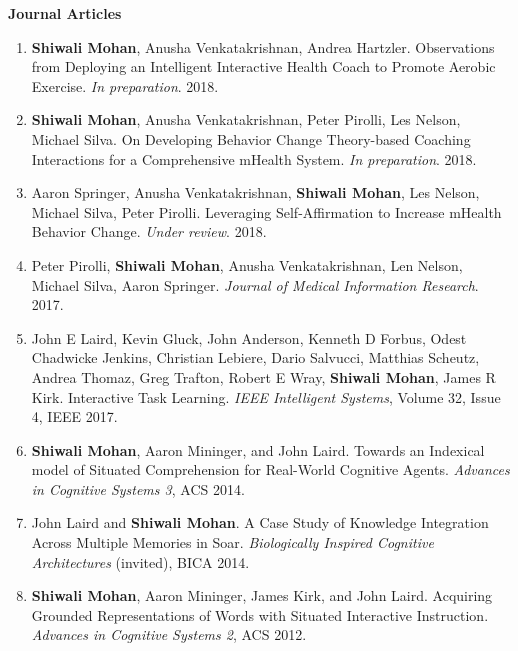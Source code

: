 \documentclass[margin,line,11pt]{res}
\begin{document}
\begin{resume}
\textbf{Journal Articles}
\begin{enumerate}[label=\lbrack J\arabic*\rbrack, leftmargin=*]
\item \textbf{Shiwali Mohan}, Anusha Venkatakrishnan, Andrea Hartzler. Observations from Deploying an Intelligent Interactive Health Coach to Promote Aerobic Exercise. \emph{In preparation}. 2018.
    \item \textbf{Shiwali Mohan}, Anusha Venkatakrishnan, Peter Pirolli, Les Nelson, Michael Silva. On Developing Behavior Change Theory-based Coaching Interactions for a Comprehensive mHealth System. \emph{In preparation}. 2018.
\item Aaron Springer, Anusha Venkatakrishnan, \textbf{Shiwali Mohan}, Les Nelson, Michael Silva, Peter Pirolli. Leveraging Self-Affirmation to Increase mHealth Behavior Change. \emph{Under review}. 2018.
\item Peter Pirolli, \textbf{Shiwali Mohan}, Anusha Venkatakrishnan, Len Nelson, Michael Silva, Aaron Springer. \emph{Journal of Medical Information Research}. 2017.
\item John E Laird, Kevin Gluck, John Anderson, Kenneth D Forbus, Odest Chadwicke Jenkins, Christian Lebiere, Dario Salvucci, Matthias Scheutz, Andrea Thomaz, Greg Trafton, Robert E Wray, \textbf{Shiwali Mohan}, James R Kirk. Interactive Task Learning. \emph{IEEE Intelligent Systems}, Volume 32, Issue 4, IEEE 2017.
\item \textbf{Shiwali Mohan}, Aaron Mininger, and John Laird. Towards an Indexical model of Situated Comprehension for Real-World Cognitive Agents. \emph{Advances in Cognitive Systems 3}, ACS 2014.
\item John Laird and \textbf{Shiwali Mohan}. A Case Study of Knowledge Integration Across Multiple Memories in Soar. \emph{Biologically Inspired Cognitive Architectures} (invited), BICA 2014.
\item \textbf{Shiwali Mohan}, Aaron Mininger, James Kirk, and John Laird. Acquiring Grounded Representations of Words with Situated Interactive Instruction. \emph{Advances in Cognitive Systems 2}, ACS 2012.
\end{enumerate}



\end{resume}
\end{document}
